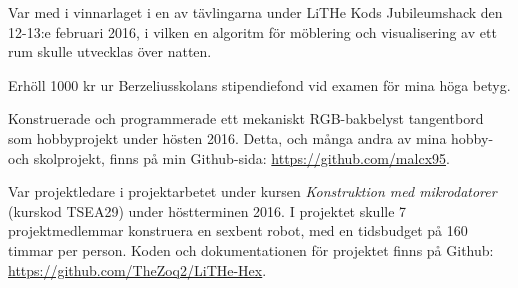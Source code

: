 \documentclass[a4paper,notitlepage]{article}
\begin{document}
Var med i vinnarlaget i en av tävlingarna under LiTHe Kods Jubileumshack den
12-13:e februari 2016, i vilken en algoritm för möblering och visualisering av 
ett rum skulle utvecklas över natten.

Erhöll 1000 kr ur Berzeliusskolans stipendiefond vid examen för mina höga
betyg.

Konstruerade och programmerade ett mekaniskt RGB-bakbelyst tangentbord som
hobbyprojekt under hösten 2016. Detta, och många andra av mina hobby- och skolprojekt, finns på min Github-sida: \url{https://github.com/malcx95}.

Var projektledare i projektarbetet under kursen \textit{Konstruktion med
mikrodatorer} (kurskod TSEA29) under höstterminen 2016.
I projektet skulle 7 projektmedlemmar
konstruera en sexbent robot, med en tidsbudget på 160 timmar per person. Koden
och dokumentationen för projektet finns på Github:
\url{https://github.com/TheZoq2/LiTHe-Hex}.
\end{document}
